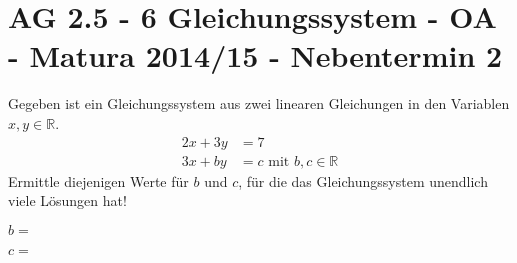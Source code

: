 \section{AG 2.5 - 6 Gleichungssystem - OA - Matura 2014/15 - Nebentermin 2}

\begin{beispiel}[AG 2.5]{1} %
				Gegeben ist ein Gleichungssystem aus zwei linearen Gleichungen in den Variablen $x,y\in\mathbb{R}$.
			\begin{align*} 2x+3y &= 7\\ 3x+by &= c\text{ mit }b,c\in\mathbb{R} \end{align*}
			Ermittle diejenigen Werte für $b$ und $c$, für die das Gleichungssystem unendlich viele Lösungen hat!
			\leer
			
			$b=$ 
			\leer
			
			$c=$ 
\end{beispiel}